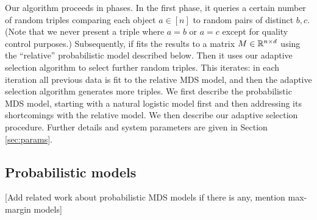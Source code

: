 \documentclass{article}
\begin{document}
Our algorithm proceeds in phases.  In the first phase, it queries a certain number of random triples comparing each object $a \in [n]$ to random pairs of distinct $b,c$.  (Note that we never present a triple where $a=b$ or $a=c$ except for quality control purposes.) Subsequently, if fits the results to a matrix $M \in \mathbb{R}^{n \times d}$ using the ``relative'' probabilistic model described below.  Then it uses our adaptive selection algorithm to select further random triples.  This iterates: in each iteration all previous data is fit to the relative MDS model, and then the adaptive selection algorithm generates more triples.  We first describe the probabilistic MDS model, starting with a natural logistic model first and then addressing its shortcomings with the relative model.  We then describe our adaptive selection procedure.  Further details and system parameters are given in Section \ref{sec:params}.

\subsection{Probabilistic models}

[Add related work about probabilistic MDS models if there is any, mention max-margin models]
\end{document}
